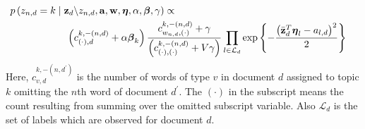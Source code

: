 \begin{eqnarray}
\lefteqn{p\left(z_{n,d}=k\mid\mathbf{z}_d\backslash z_{n,d},\mathbf{a},\mathbf{w},\mathbf{\boldsymbol\eta},\alpha,\boldsymbol\beta,\gamma\right)\propto}\nonumber \\
 & \hspace{2cm}\left(c_{\left(\cdot\right),d}^{k,-\left(n,d\right)}+\alpha\boldsymbol\beta_{k}\right)\frac{c_{w_{n,d},\left(\cdot\right)}^{k,-\left(n,d\right)}+\gamma}{\left(c_{\left(\cdot\right),\left(\cdot\right)}^{k,-\left(n,d\right)}+V\gamma\right)}\prod_{l\in\mathcal{L}_{d}}\exp\left\{ -\frac{\left(\bar{\mathbf{z}}_{d}^{T}\boldsymbol\eta_{l}-a_{l,d}\right)^{2}}{2}\right\} \label{eq:z-likelihood}\end{eqnarray}
 Here, $c_{v,d}^{k,-\left(n,d^{\prime}\right)}$ is the number
of words of type $v$ in document $d$ assigned to topic $k$ omitting
the $n$th word of document $d^{\prime}$. The $(\cdot)$
in the subscript means the count resulting from summing over the omitted
subscript variable.  Also $\mathcal{L}_{d}$ is the set of labels which are observed for document $d$.


